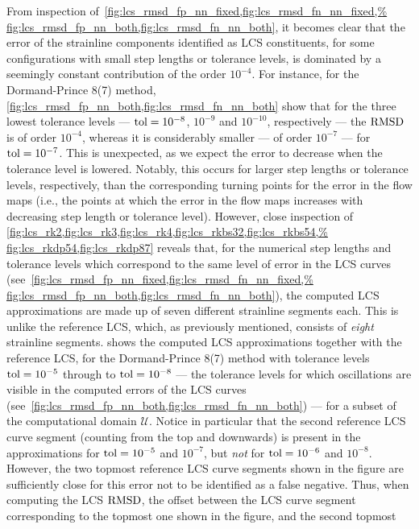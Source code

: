 From inspection of~\cref{fig:lcs_rmsd_fp_nn_fixed,fig:lcs_rmsd_fn_nn_fixed,%
fig:lcs_rmsd_fp_nn_both,fig:lcs_rmsd_fn_nn_both}, it becomes clear that the
error of the strainline components identified as LCS constituents, for some
configurations with small step lengths or tolerance levels, is dominated by
a seemingly constant contribution of the order $10^{-4}$. For instance,
for the Dormand-Prince 8(7) method,
\cref{fig:lcs_rmsd_fp_nn_both,fig:lcs_rmsd_fn_nn_both} show that for the three
lowest tolerance levels --- $\textnormal{tol}=10^{-8}$, $10^{-9}$ and
$10^{-10}$, respectively --- the $\operatorname{RMSD}$ is of order $10^{-4}$, whereas it is
considerably smaller --- of order $10^{-7}$ --- for $\textnormal{tol}=10^{-7}$.
This is unexpected, as we expect the error to decrease when the tolerance level
is lowered.  Notably, this occurs for larger step lengths or tolerance levels,
respectively, than the corresponding turning points for the error in the flow
maps (i.e., the points at which the error in the flow maps increases with
decreasing step length or tolerance level). However, close inspection of
\cref{fig:lcs_rk2,fig:lcs_rk3,fig:lcs_rk4,fig:lcs_rkbs32,fig:lcs_rkbs54,%
fig:lcs_rkdp54,fig:lcs_rkdp87} reveals that, for the numerical step lengths
and tolerance levels which correspond to the same level of error in the LCS
curves (see~\cref{fig:lcs_rmsd_fp_nn_fixed,fig:lcs_rmsd_fn_nn_fixed,%
fig:lcs_rmsd_fp_nn_both,fig:lcs_rmsd_fn_nn_both}), the computed LCS
approximations are made up of seven different strainline segments each. This
is unlike the reference LCS, which, as previously mentioned, consists
of \emph{eight} strainline segments.
\clearpage
{} shows the computed LCS approximations together
with the reference LCS, for the Dormand-Prince 8(7) method with tolerance
levels $\textnormal{tol}=10^{-5}$ through to $\textnormal{tol}=10^{-8}$ ---
the tolerance levels for which oscillations are visible in the computed errors
of the LCS curves (see~\cref{fig:lcs_rmsd_fp_nn_both,fig:lcs_rmsd_fn_nn_both})
--- for a subset of the computational domain $\mathcal{U}$. Notice in
particular that the second reference LCS curve segment (counting from the top
and downwards) is present in the approximations for $\textnormal{tol}=10^{-5}$
and $10^{-7}$, but \emph{not} for $\textnormal{tol}=10^{-6}$ and $10^{-8}$.
However, the two topmost reference LCS curve segments shown in the figure
are sufficiently close for this error not to be identified as a false negative.
Thus, when computing the LCS $\operatorname{RMSD}$, the offset between the LCS curve segment
corresponding to the topmost one shown in the figure, and the second topmost

